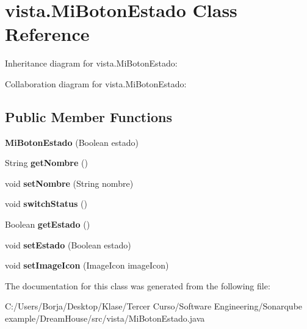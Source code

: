\hypertarget{classvista_1_1_mi_boton_estado}{}\section{vista.\+Mi\+Boton\+Estado Class Reference}
\label{classvista_1_1_mi_boton_estado}


Inheritance diagram for vista.\+Mi\+Boton\+Estado\+:


Collaboration diagram for vista.\+Mi\+Boton\+Estado\+:
\subsection*{Public Member Functions}
\begin{DoxyCompactItemize}
\item 
\mbox{\label{classvista_1_1_mi_boton_estado_ac7a7e4aa70b02f321423183b014e6b20}} 
{\bfseries Mi\+Boton\+Estado} (Boolean estado)
\item 
\mbox{\label{classvista_1_1_mi_boton_estado_a342f778571f033ad6d0ca8c633f1015f}} 
String {\bfseries get\+Nombre} ()
\item 
\mbox{\label{classvista_1_1_mi_boton_estado_a6649ee4877d13535560223e9893be0df}} 
void {\bfseries set\+Nombre} (String nombre)
\item 
\mbox{\label{classvista_1_1_mi_boton_estado_a3adf7c116ea22a32abb8897401c3272d}} 
void {\bfseries switch\+Status} ()
\item 
\mbox{\label{classvista_1_1_mi_boton_estado_a997a9b8cff0e7b872c062cf7844d1c93}} 
Boolean {\bfseries get\+Estado} ()
\item 
\mbox{\label{classvista_1_1_mi_boton_estado_a767f2c7dac98d8a235c957f1c4e01b8c}} 
void {\bfseries set\+Estado} (Boolean estado)
\item 
\mbox{\label{classvista_1_1_mi_boton_estado_ad4d9724658d80cbfc47afd59fe5833ef}} 
void {\bfseries set\+Image\+Icon} (Image\+Icon image\+Icon)
\end{DoxyCompactItemize}


The documentation for this class was generated from the following file\+:\begin{DoxyCompactItemize}
\item 
C\+:/\+Users/\+Borja/\+Desktop/\+Klase/\+Tercer Curso/\+Software Engineering/\+Sonarqube example/\+Dream\+House/src/vista/Mi\+Boton\+Estado.\+java\end{DoxyCompactItemize}
